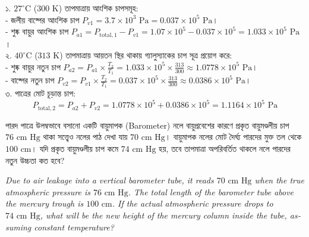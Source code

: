 \documentclass[12pt, a4paper]{article}
\begin{document}
{\vspace{1em}

\begin{tcolorbox}[solutionbox={সমাধান (Solution)}]
\noindent
১. $27^\circ\text{C}$ ($300\text{ K}$) তাপমাত্রায় আংশিক চাপসমূহ: \\
- জলীয় বাষ্পের আংশিক চাপ $P_{v1} = 3.7 \times 10^3\text{ Pa} = 0.037 \times 10^5\text{ Pa}$। \\
- শুষ্ক বায়ুর আংশিক চাপ $P_{a1} = P_{\text{total},1} - P_{v1} = 1.07 \times 10^5 - 0.037 \times 10^5 = 1.033 \times 10^5\text{ Pa}$। \\
২. $40^\circ\text{C}$ ($313\text{ K}$) তাপমাত্রায় আয়তন স্থির থাকায় গ্যালুস্যাকের চাপ সূত্র প্রয়োগ করে: \\
- শুষ্ক বায়ুর নতুন চাপ $P_{a2} = P_{a1} \times \frac{T_2}{T_1} = 1.033 \times 10^5 \times \frac{313}{300} \approx 1.0778 \times 10^5\text{ Pa}$। \\
- বাষ্পের নতুন চাপ $P_{v2} = P_{v1} \times \frac{T_2}{T_1} = 0.037 \times 10^5 \times \frac{313}{300} \approx 0.0386 \times 10^5\text{ Pa}$। \\
৩. পাত্রের মোট চূড়ান্ত চাপ:
\[ P_{\text{total},2} = P_{a2} + P_{v2} = 1.0778 \times 10^5 + 0.0386 \times 10^5 = 1.1164 \times 10^5\text{ Pa} \]
\end{tcolorbox}

\vspace{1.5em}

\begin{tcolorbox}[questionbox={প্রশ্ন (Question) 7}]
\noindent
পারদ পাত্রে উলম্বভাবে বসানো একটি বায়ুমাপক (Barometer) নলে বায়ুপ্রবেশের কারণে প্রকৃত বায়ুমণ্ডলীয় চাপ $76\text{ cm Hg}$ থাকা সত্ত্বেও নলের পাঠ দেখা যায় $70\text{ cm Hg}$। বায়ুমাপক নলের মোট দৈর্ঘ্য পারদের মুক্ত তল থেকে $100\text{ cm}$। যদি প্রকৃত বায়ুমণ্ডলীয় চাপ কমে $74\text{ cm Hg}$ হয়, তবে তাপমাত্রা অপরিবর্তিত থাকলে নলে পারদের নতুন উচ্চতা কত হবে?

\vspace{0.8em}
\begin{english}
\noindent\textit{\color{darkgray}
Due to air leakage into a vertical barometer tube, it reads $70\text{ cm Hg}$ when the true atmospheric pressure is $76\text{ cm Hg}$. The total length of the barometer tube above the mercury trough is $100\text{ cm}$. If the actual atmospheric pressure drops to $74\text{ cm Hg}$, what will be the new height of the mercury column inside the tube, assuming constant temperature?
}
\end{english}
\end{tcolorbox}

}
\end{document}
